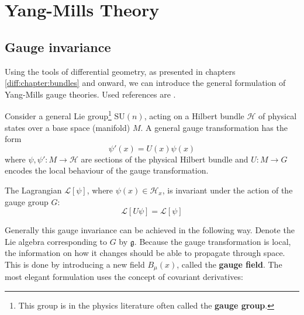 \chapter{Yang-Mills Theory}

\section{Gauge invariance}

	Using the tools of differential geometry, as presented in chapters \ref{diff:chapter:bundles} and onward, we can introduce the general formulation of Yang-Mills gauge theories. Used references are \cite{principal_bundles,sen_nash,schuller, gauge1}.

	Consider a general Lie group\footnote{This group is in the physics literature often called the \textbf{gauge group}.} SU$(n)$, acting on a Hilbert bundle $\mathcal{H}$ of physical states over a base space (manifold) $M$. A general gauge transformation has the form
	\begin{equation}
		\label{qft:gauge_transformation}
		\psi'(x) = U(x)\psi(x)
	\end{equation}
	where $\psi, \psi':M\rightarrow\mathcal{H}$ are sections of the physical Hilbert bundle and $U:M\rightarrow G$ encodes the local behaviour of the gauge transformation.
	
	\begin{theorem}
		The Lagrangian $\mathcal{L}[\psi]$, where $\psi(x)\in\mathcal{H}_x$, is invariant under the action of the gauge group $G$:
		\begin{equation}
			\mathcal{L}[U\psi] = \mathcal{L}[\psi]
		\end{equation}
	\end{theorem}
	
	Generally this gauge invariance can be achieved in the following way. Denote the Lie algebra corresponding to $G$ by $\mathfrak{g}$. Because the gauge transformation is local, the information on how it changes should be able to propagate through space. This is done by introducing a new field $B_\mu(x)$, called the \textbf{gauge field}. The most elegant formulation uses the concept of covariant derivatives:
	
